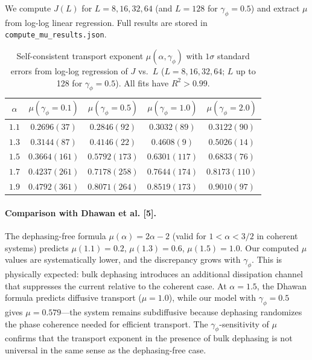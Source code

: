 \documentclass[aps,prb,twocolumn,superscriptaddress]{revtex4-2}
\begin{document}
We compute $J(L)$ for $L = 8, 16, 32, 64$ (and $L = 128$ for $\gamma_\phi = 0.5$) and extract $\mu$ from log-log linear regression. Full results are stored in \texttt{compute\_mu\_results.json}.

\begin{table}[h]
\caption{Self-consistent transport exponent $\mu(\alpha, \gamma_\phi)$ with $1\sigma$ standard errors from log-log regression of $J$ vs.\ $L$ ($L = 8, 16, 32, 64$; $L$ up to 128 for $\gamma_\phi=0.5$). All fits have $R^2 > 0.99$.}
\label{tab:S8}
\begin{ruledtabular}
\begin{tabular}{c|cccc}
$\alpha$ & $\mu(\gamma_\phi{=}0.1)$ & $\mu(\gamma_\phi{=}0.5)$ & $\mu(\gamma_\phi{=}1.0)$ & $\mu(\gamma_\phi{=}2.0)$ \\
\hline
$1.1$ & $0.2696(37)$ & $0.2846(92)$ & $0.3032(89)$ & $0.3122(90)$ \\
$1.3$ & $0.3144(87)$ & $0.4146(22)$ & $0.4608(9)$  & $0.5026(14)$ \\
$1.5$ & $0.3664(161)$ & $0.5792(173)$ & $0.6301(117)$ & $0.6833(76)$ \\
$1.7$ & $0.4237(261)$ & $0.7178(258)$ & $0.7644(174)$ & $0.8173(110)$ \\
$1.9$ & $0.4792(361)$ & $0.8071(264)$ & $0.8519(173)$ & $0.9010(97)$ \\
\end{tabular}
\end{ruledtabular}
\end{table}

\paragraph{Comparison with Dhawan et al. [5].}
The dephasing-free formula $\mu(\alpha) = 2\alpha-2$ (valid for $1 < \alpha < 3/2$ in coherent systems) predicts $\mu(1.1) = 0.2$, $\mu(1.3) = 0.6$, $\mu(1.5) = 1.0$. Our computed $\mu$ values are systematically lower, and the discrepancy grows with $\gamma_\phi$. This is physically expected: bulk dephasing introduces an additional dissipation channel that suppresses the current relative to the coherent case. At $\alpha = 1.5$, the Dhawan formula predicts diffusive transport ($\mu = 1.0$), while our model with $\gamma_\phi = 0.5$ gives $\mu = 0.579$---the system remains subdiffusive because dephasing randomizes the phase coherence needed for efficient transport. The $\gamma_\phi$-sensitivity of $\mu$ confirms that the transport exponent in the presence of bulk dephasing is not universal in the same sense as the dephasing-free case.
\end{document}
